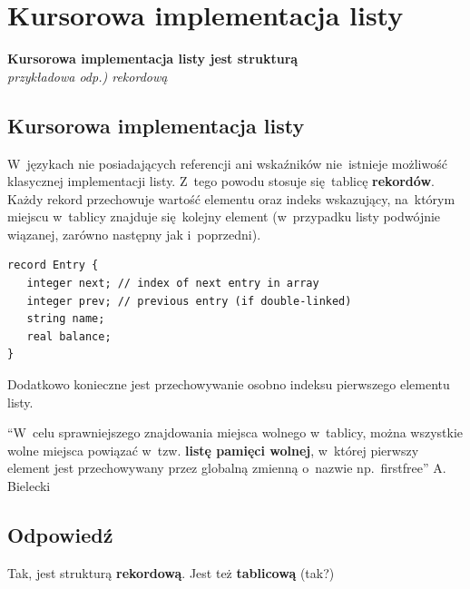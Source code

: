\section{Kursorowa implementacja listy}
\textbf{Kursorowa implementacja listy jest strukturą}\\
\textit{przykładowa odp.) rekordową}

\vspace{0.4cm}


\subsection{Kursorowa implementacja listy}
W~językach nie posiadających referencji ani wskaźników nie~istnieje możliwość klasycznej implementacji listy. Z~tego powodu stosuje się~tablicę \textbf{rekordów}. Każdy rekord przechowuje wartość elementu oraz indeks wskazujący, na~którym miejscu w~tablicy znajduje się~kolejny element (w~przypadku listy podwójnie wiązanej, zarówno następny jak i~poprzedni).

\begin{lstlisting}
record Entry {
   integer next; // index of next entry in array
   integer prev; // previous entry (if double-linked)
   string name;
   real balance;
}
\end{lstlisting}
Dodatkowo konieczne jest przechowywanie osobno indeksu pierwszego elementu listy.
 
``W~celu sprawniejszego znajdowania miejsca wolnego w~tablicy, można wszystkie wolne miejsca powiązać w~tzw. \textbf{listę pamięci wolnej}, w~której pierwszy element jest przechowywany przez  globalną zmienną o~nazwie np.~firstfree'' A. Bielecki 
 
\subsection{Odpowiedź}
Tak, jest strukturą \textbf{rekordową}. Jest też \textbf{tablicową} (tak?)